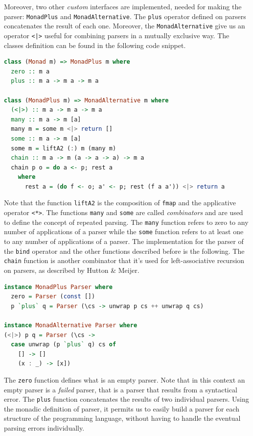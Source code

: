 \documentclass[12pt,a4paper]{article}
\begin{document}
Moreover, two other \textit{custom} interfaces are implemented, needed for making the parser: \texttt{MonadPlus} and \texttt{MonadAlternative}.
The \texttt{plus} operator defined on parsers concatenates the result of each one.
Moreover, the \texttt{MonadAlternative} give us an operator \texttt{<|>} useful for combining parsers in a mutually exclusive way.
The classes definition can be found in the following code snippet.
\begin{lstlisting}[language=Haskell, style=custom-style]
class (Monad m) => MonadPlus m where
  zero :: m a
  plus :: m a -> m a -> m a

class (MonadPlus m) => MonadAlternative m where
  (<|>) :: m a -> m a -> m a
  many :: m a -> m [a]
  many m = some m <|> return []
  some :: m a -> m [a]
  some m = liftA2 (:) m (many m)
  chain :: m a -> m (a -> a -> a) -> m a
  chain p o = do a <- p; rest a
    where
      rest a = (do f <- o; a' <- p; rest (f a a')) <|> return a
\end{lstlisting}
Note that the function \texttt{liftA2} is the composition of \texttt{fmap} and the applicative operator \texttt{<*>}.
The functions \texttt{many} and \texttt{some} are called \textit{combinators} and are used to define the concept of repeated parsing.
The \texttt{many} function refers to zero to any number of applications of a parser while the \texttt{some} function refers to at least one to any number of applications of a parser.
The implementation for the parser of the \texttt{bind} operator and the other functions described before is the following.
The \texttt{chain} function is another combinator that it's used for left-associative recursion on parsers, as described by Hutton \& Meijer.
\begin{lstlisting}[language=Haskell, style=custom-style]
instance MonadPlus Parser where
  zero = Parser (const [])
  p `plus` q = Parser (\cs -> unwrap p cs ++ unwrap q cs)

instance MonadAlternative Parser where
(<|>) p q = Parser (\cs ->
  case unwrap (p `plus` q) cs of
    [] -> []
    (x : _) -> [x])
\end{lstlisting}
The \texttt{zero} function defines what is an empty parser.
Note that in this context an empty parser is a \textit{failed} parser, that is a parser that results from a syntactical error.
The \texttt{plus} function concatenates the results of two individual parsers.
Using the monadic definition of parser, it permits us to easily build a parser for each structure of the programming language, without having to handle the eventual parsing errors individually.
\end{document}
